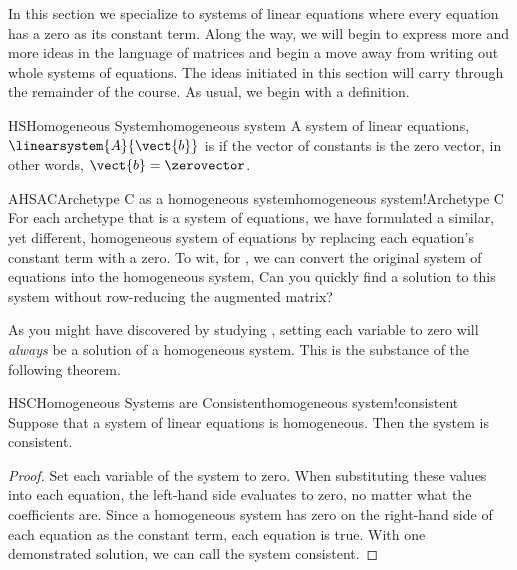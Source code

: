 %
In this section we specialize to systems of linear equations where every equation has a zero as its constant term.  Along the way, we will begin to express more and more ideas in the language of matrices and begin a move away from writing out whole systems of equations.  The ideas initiated in this section will carry through the remainder of the course.
%
%
As usual, we begin with a definition.
%
\begin{definition}{HS}{Homogeneous System}{homogeneous system}
A system of linear equations, $\linearsystem{A}{\vect{b}}$ is  if the vector of constants is the zero vector, in other words, $\vect{b}=\zerovector$.
%
\end{definition}
%
\begin{example}{AHSAC}{Archetype C as a homogeneous system}{homogeneous system!Archetype C}
For each archetype that is a system of equations, we have formulated a similar, yet different, homogeneous system of equations by replacing each equation's constant term with a zero.  To wit, for , we can convert the original system of equations into the homogeneous system,
%
%
Can you quickly find a solution to this system without row-reducing the augmented matrix?
\end{example}
%
As you might have discovered by studying , setting each variable to zero will {\em always} be a solution of a homogeneous system.  This is the substance of the following theorem.
%
\begin{theorem}{HSC}{Homogeneous Systems are Consistent}{homogeneous system!consistent}
Suppose that a system of linear equations is homogeneous.  Then the system is consistent.
\end{theorem}
%
\begin{proof}
Set each variable of the system to zero.  When substituting these values into each equation, the left-hand side evaluates to zero, no matter what the coefficients are.  Since a homogeneous system has zero on the right-hand side of each equation as the constant term, each equation is true.  With one demonstrated solution, we can call the system consistent.
\end{proof}
